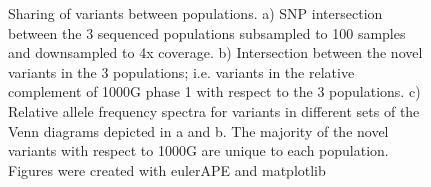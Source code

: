 \begin{figure}[htp]
\centering
{}
\caption{Sharing of variants between populations. a) SNP intersection between the 3 sequenced populations subsampled to 100 samples and downsampled to 4x coverage. b) Intersection between the novel variants in the 3 populations; i.e. variants in the relative complement of \gls{1000G} phase 1 with respect to the 3 populations. c) Relative allele frequency spectra for variants in different sets of the Venn diagrams depicted in a and b. The majority of the novel variants with respect to \gls{1000G} are unique to each population. Figures were created with eulerAPE\cite{10.1371/journal.pone.0101717} and matplotlib\cite{Hunter2007}}
\label{fig:intersection}
\end{figure}